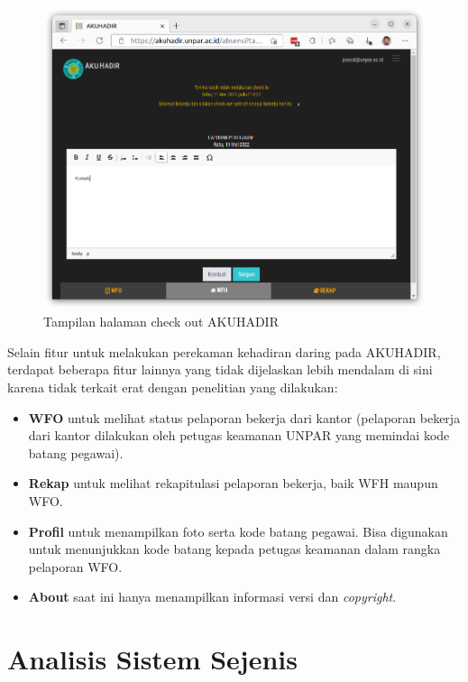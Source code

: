 \begin{figure}[H]
	\centering
	\includegraphics[scale=0.28]{Gambar/akuhadir-4-wfh-checkout.png}
	\caption{Tampilan halaman check out AKUHADIR} 
	\label{fig:akuhadir-4-wfh-checkout}
\end{figure}
Selain fitur untuk melakukan perekaman kehadiran daring pada AKUHADIR, terdapat beberapa fitur lainnya yang tidak dijelaskan lebih mendalam di sini karena tidak terkait erat dengan penelitian yang dilakukan:

\begin{itemize}
	\item \textbf{WFO} untuk melihat status pelaporan bekerja dari kantor (pelaporan bekerja dari kantor dilakukan oleh petugas keamanan UNPAR yang memindai kode batang pegawai).
	\item \textbf{Rekap} untuk melihat rekapitulasi pelaporan bekerja, baik WFH maupun WFO.
	\item \textbf{Profil} untuk menampilkan foto serta kode batang pegawai. Bisa digunakan untuk menunjukkan kode batang kepada petugas keamanan dalam rangka pelaporan WFO.
	\item \textbf{About} saat ini hanya menampilkan informasi versi dan \textit{copyright}.
\end{itemize}

\section{Analisis Sistem Sejenis}

